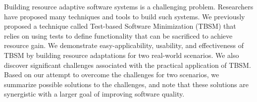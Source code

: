 Building resource adaptive software systems is a challenging problem. Researchers have proposed many techniques and tools to build such systems. We previously proposed a technique called Test-based Software Minimization (TBSM) that relies on using tests to define functionality that can be sacrificed to achieve resource gain. We demonstrate easy-applicability, usability, and effectiveness of TBSM by building resource adaptations for two real-world scenarios. We also discover significant challenges associated with the practical application of TBSM. Based on our attempt to overcome the challenges for two scenarios, we summarize possible solutions to the challenges, and note that these solutions are synergistic with a larger goal of improving software quality.
